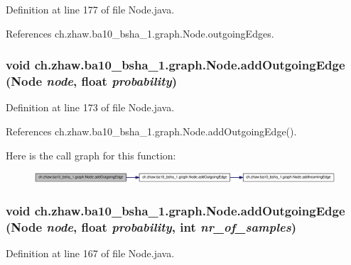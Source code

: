 Definition at line 177 of file Node.java.

References ch.zhaw.ba10\_\-bsha\_\-1.graph.Node.outgoingEdges.\hypertarget{classch_1_1zhaw_1_1ba10__bsha__1_1_1graph_1_1Node_aeb5d29fd379ad2b13cadbac51f880390}{
\subsubsection[{addOutgoingEdge}]{\setlength{\rightskip}{0pt plus 5cm}void ch.zhaw.ba10\_\-bsha\_\-1.graph.Node.addOutgoingEdge ({\bf Node} {\em node}, \/  float {\em probability})}}
\label{classch_1_1zhaw_1_1ba10__bsha__1_1_1graph_1_1Node_aeb5d29fd379ad2b13cadbac51f880390}


Definition at line 173 of file Node.java.

References ch.zhaw.ba10\_\-bsha\_\-1.graph.Node.addOutgoingEdge().

Here is the call graph for this function:\nopagebreak
\begin{figure}[H]
\begin{center}
\leavevmode
\includegraphics[width=420pt]{classch_1_1zhaw_1_1ba10__bsha__1_1_1graph_1_1Node_aeb5d29fd379ad2b13cadbac51f880390_cgraph}
\end{center}
\end{figure}
\hypertarget{classch_1_1zhaw_1_1ba10__bsha__1_1_1graph_1_1Node_a898dcdd240251792e45ea79352536dce}{
\subsubsection[{addOutgoingEdge}]{\setlength{\rightskip}{0pt plus 5cm}void ch.zhaw.ba10\_\-bsha\_\-1.graph.Node.addOutgoingEdge ({\bf Node} {\em node}, \/  float {\em probability}, \/  int {\em nr\_\-of\_\-samples})}}
\label{classch_1_1zhaw_1_1ba10__bsha__1_1_1graph_1_1Node_a898dcdd240251792e45ea79352536dce}


Definition at line 167 of file Node.java.

